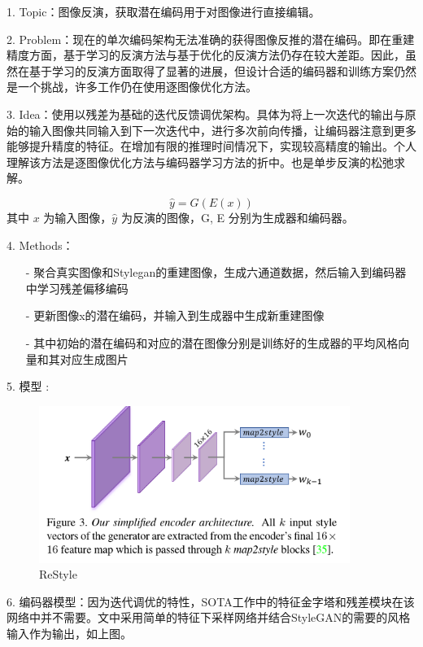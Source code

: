1. Topic：图像反演，获取潜在编码用于对图像进行直接编辑。

2. Problem：现在的单次编码架构无法准确的获得图像反推的潜在编码。即在重建精度方面，基于学习的反演方法与基于优化的反演方法仍存在较大差距。因此，虽然在基于学习的反演方面取得了显著的进展，但设计合适的编码器和训练方案仍然是一个挑战，许多工作仍在使用逐图像优化方法。

3. Idea：使用以残差为基础的迭代反馈调优架构。具体为将上一次迭代的输出与原始的输入图像共同输入到下一次迭代中，进行多次前向传播，让编码器注意到更多能够提升精度的特征。在增加有限的推理时间情况下，实现较高精度的输出。个人理解该方法是逐图像优化方法与编码器学习方法的折中。也是单步反演的松弛求解。

\begin{equation}
\hat{y}=G(E(x))
\end{equation}
其中 $x$ 为输入图像，$\hat{y}$ 为反演的图像，G, E 分别为生成器和编码器。

4. Methods：

\begin{enumerate}
 \item [-] 聚合真实图像和Stylegan的重建图像，生成六通道数据，然后输入到编码器中学习残差偏移编码
 \item [-] 更新图像x的潜在编码，并输入到生成器中生成新重建图像
 \item [-] 其中初始的潜在编码和对应的潜在图像分别是训练好的生成器的平均风格向量和其对应生成图片
\end{enumerate}

5. 模型 :

\begin{figure}[htb]
\centering 
\includegraphics[width=0.9\textwidth]{img/m2t26.png} 
\caption{ReStyle}
\label{Test}
\end{figure}

6. 编码器模型：因为迭代调优的特性，SOTA工作中的特征金字塔和残差模块在该网络中并不需要。文中采用简单的特征下采样网络并结合StyleGAN的需要的风格输入作为输出，如上图。

